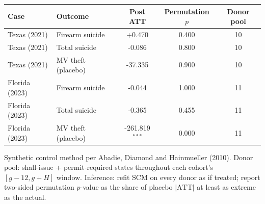 \begin{threeparttable}
\caption{Synthetic-control per-state results (post-period mean ATT, per 100,000)}
\label{tab:scm}
\begin{tabular}{llccc}
\toprule
Case & Outcome & Post ATT & Permutation $p$ & Donor pool \\
\midrule
  Texas (2021) & Firearm suicide & +0.470 & 0.400 & 10 \\
  Texas (2021) & Total suicide & -0.086 & 0.800 & 10 \\
  Texas (2021) & MV theft (placebo) & -37.335 & 0.900 & 10 \\
  Florida (2023) & Firearm suicide & -0.044 & 1.000 & 11 \\
  Florida (2023) & Total suicide & -0.365 & 0.455 & 11 \\
  Florida (2023) & MV theft (placebo) & -261.819$^{***}$ & 0.000 & 11 \\
\bottomrule
\end{tabular}
\begin{tablenotes}\footnotesize
\item Synthetic control method per Abadie, Diamond and Hainmueller (2010). Donor pool: shall-issue + permit-required states throughout each cohort's $[g-12, g+H]$ window. Inference: refit SCM on every donor as if treated; report two-sided permutation $p$-value as the share of placebo $|\textrm{ATT}|$ at least as extreme as the actual.
\end{tablenotes}
\end{threeparttable}
